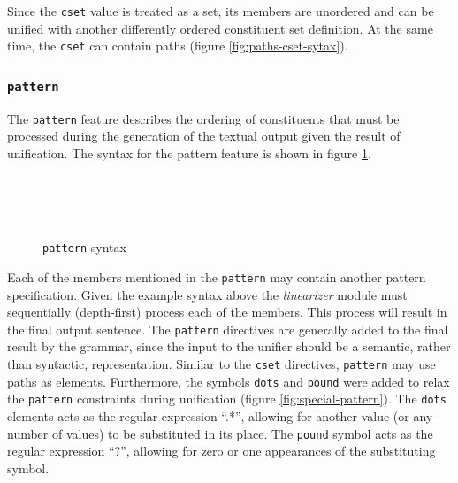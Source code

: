 \documentclass[12pt]{article}
\begin{document}
{Since the \texttt{cset} value is treated as a set, its members are unordered and can be unified
with another differently ordered constituent set definition. At the same time, the \texttt{cset} can
contain paths (figure \ref{fig:paths-cset-sytax}). 

\subsubsection{\texttt{pattern}}
The \texttt{pattern} feature describes the ordering of constituents that must be processed during 
the generation of the textual output given the result of unification. The syntax for the pattern 
feature is shown in figure \ref{pattern-syntax}.
\begin{figure}[h!]
    \centering
{\scriptsize
{} \\
 \\
 \\
}
\caption{\texttt{pattern} syntax}
\label{pattern-syntax}
\end{figure}

Each of the members mentioned in the \texttt{pattern} may contain another pattern specification. Given
the example syntax above the \textit{linearizer} module must sequentially (depth-first) process each of
the members. This process will result in the final output sentence. The \texttt{pattern} directives
are generally added to the final result by the grammar, since the input to the unifier should
be a semantic, rather than syntactic, representation. Similar to the \texttt{cset} directives, \texttt{pattern}
may use paths as elements. Furthermore, the symbols \texttt{dots} and \texttt{pound} were added to relax the \texttt{pattern}
constraints during unification (figure \ref{fig:special-pattern}). The \texttt{dots} elements
acts as the regular expression ``.*'', allowing for another value (or any number of values)
to be substituted in its place. The 
\texttt{pound} symbol acts as the regular expression ``?'', allowing for zero 
or one appearances of the substituting symbol.

}
\end{document}
